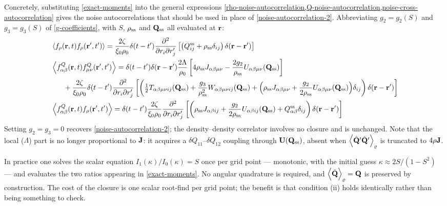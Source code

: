 \documentclass[a5paper]{article}
\begin{document}
Concretely, substituting \eqref{exact-moments} into the general expressions \cref{rho-noise-autocorrelation,Q-noise-autocorrelation,noise-cross-autocorrelation} gives the noise autocorrelations that should be used in place of \cref{noise-autocorrelation-2}. Abbreviating $g_2 = g_2(S)$ and $g_3 = g_3(S)$ of \eqref{g-coefficients}, with $S$, $\rho_\ss$ and $\Q_\ss$ all evaluated at $\r$:
\begin{subequations}
    \label{noise-autocorrelation-exact}
\begin{align}
    &\la f_\rho(\r, t) f_\rho(\r', t') \ra = \frac{2\zeta}{\xi_0\rho_0} \delta(t-t')\frac{\partial^2}{\partial r_i \partial r'_j}\left[\left(Q^\ss_{ij} + \rho_\ss\delta_{ij}\right)\delta(\r-\r')\right]
    \\
    &\la f^Q_\ab(\r, t) f^Q_\mn(\r', t') \ra =
    \delta(t-t') \delta(\r-\r') \frac{2\Lambda}{\rho_0}
    \left[4\rho_\ss J_\abmn - \frac{2 g_2}{\rho_\ss} U_\abmn(\Q_\ss)\right]
    \\
    &\hspace{0.6cm}+\frac{2\zeta}{\xi_0\rho_0} \delta(t-t')\frac{\partial^2}{\partial r_i \partial r'_j}\left[\left(
        \tfrac{1}{2} T_{\abmn ij}(\Q_\ss) + \frac{g_3}{\rho_\ss^2} W_{\abmn ij}(\Q_\ss)
        + \Big(\rho_\ss J_\abmn + \frac{g_2}{2\rho_\ss} U_\abmn(\Q_\ss)\Big) \delta_{ij}
    \right)\delta(\r-\r')
    \right]
    \\
    &\la f^Q_\ab(\r, t) f_\rho(\r', t') \ra = \delta(t-t')\frac{2\zeta}{\xi_0\rho_0} \frac{\partial^2}{\partial r_i \partial r'_j}\left[
        \left(\rho_\ss J_{\ab ij} + \frac{g_2}{2\rho_\ss} U_{\ab ij}(\Q_\ss) + Q^\ss_\ab \delta_{ij}\right)
        \delta(\r-\r')
    \right]
\end{align}
\end{subequations}
Setting $g_2 = g_3 = 0$ recovers \cref{noise-autocorrelation-2}; the density--density correlator involves no closure and is unchanged. Note that the local ($\Lambda$) part is no longer proportional to $\J$: it acquires a $\delta Q_{11}$--$\delta Q_{12}$ coupling through $\U(\Q_\ss)$, absent when $\la\hat\Q'\hat\Q'\ra_\varrho$ is truncated to $4\rho\J$.

In practice one solves the scalar equation $I_1(\kappa)/I_0(\kappa) = S$ once per grid point --- monotonic, with the initial guess $\kappa \approx 2S/(1-S^2)$ --- and evaluates the two ratios appearing in \eqref{exact-moments}. No angular quadrature is required, and $\la\hat\Q\ra_\varrho = \Q$ is preserved by construction. The cost of the closure is one scalar root-find per grid point; the benefit is that condition (ii) holds identically rather than being something to check.
\end{document}
